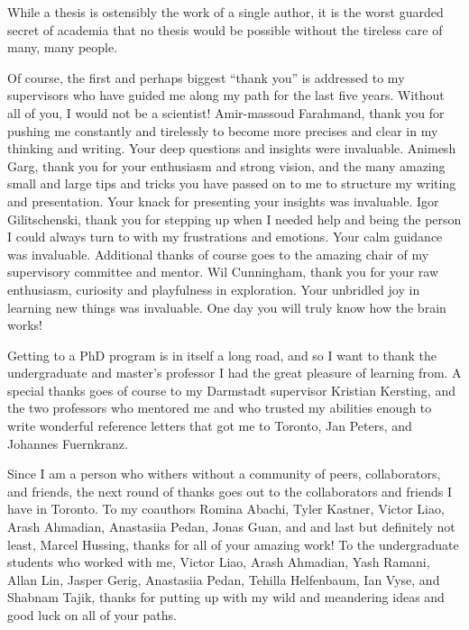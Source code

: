 While a thesis is ostensibly the work of a single author, it is the worst guarded secret of academia that no thesis would be possible without the tireless care of many, many people.

Of course, the first and perhaps biggest ``thank you'' is addressed to my supervisors who have guided me along my path for the last five years.
Without all of you, I would not be a scientist!
Amir-massoud Farahmand, thank you for pushing me constantly and tirelessly to become more precises and clear in my thinking and writing.
Your deep questions and insights were invaluable.
Animesh Garg, thank you for your enthusiasm and strong vision, and the many amazing small and large tips and tricks you have passed on to me to structure my writing and presentation.
Your knack for presenting your insights was invaluable.
Igor Gilitschenski, thank you for stepping up when I needed help and being the person I could always turn to with my frustrations and emotions.
Your calm guidance was invaluable.
Additional thanks of course goes to the amazing chair of my supervisory committee and mentor.
Wil Cunningham, thank you for your raw enthusiasm, curiosity and playfulness in exploration.
Your unbridled joy in learning new things was invaluable.
One day you will truly know how the brain works!

Getting to a PhD program is in itself a long road, and so I want to thank the undergraduate and master's professor I had the great pleasure of learning from.
A special thanks goes of course to my Darmstadt supervisor Kristian Kersting, and the two professors who mentored me and who trusted my abilities enough to write wonderful reference letters that got me to Toronto, Jan Peters, and Johannes Fuernkranz.

Since I am a person who withers without a community of peers, collaborators, and friends, the next round of thanks goes out to the collaborators and friends I have in Toronto.
To my coauthors Romina Abachi, Tyler Kastner, Victor Liao, Arash Ahmadian, Anastasiia Pedan, Jonas Guan, and and last but definitely not least, Marcel Hussing, thanks for all of your amazing work!
To the undergraduate students who worked with me, Victor Liao, Arash Ahmadian, Yash Ramani, Allan Lin, Jasper Gerig, Anastasiia Pedan, Tehilla Helfenbaum, Ian Vyse, and Shabnam Tajik, thanks for putting up with my wild and meandering ideas and good luck on all of your paths.

